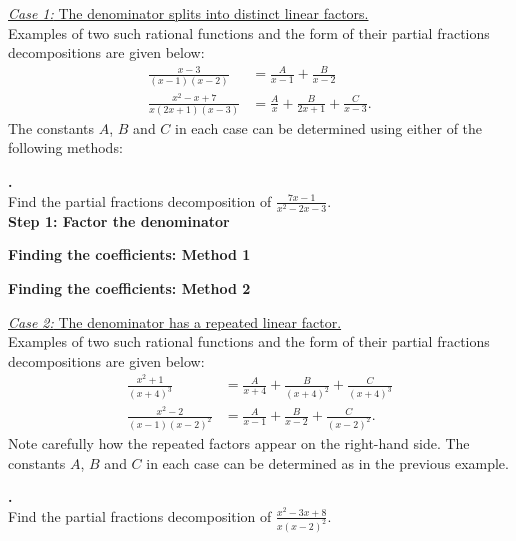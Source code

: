 \documentclass[t]{beamer}
\theoremstyle{plain}
\theoremstyle{definition}
\newcommand{\ds}{\displaystyle}
\newcounter{heading}
\newcommand{\newhead}[1]{\medskip\stepcounter{heading}\noindent\textbf{\hspace{0.2cm}{#1}.}}
\begin{document}
\begin{frame}
\noindent\underline{\textit{Case 1:} The denominator splits into distinct linear factors.}\pause\\
Examples of two such rational functions and the form of their partial fractions decompositions are given below:\pause
\begin{align*}
\frac{x-3}{(x-1)(x-2)}&= {\frac{A}{x-1}+\frac{B}{x-2}}\\
\frac{x^2-x+7}{x(2x+1)(x-3)}&= {\frac{A}{x}+\frac{B}{2x+1}+\frac{C}{x-3}}.
\end{align*}\pause
The constants $A$, $B$ and $C$ in each case can be determined using either of the following methods:\pause

\newhead{Example} \\Find the partial fractions decomposition of $\ds\frac{7x-1}{x^2-2x-3}$.\pause\\
\noindent \textbf{Step 1: Factor the denominator}

\medskip\pause

\noindent \textbf{Finding the coefficients: Method 1}

\medskip\pause

\noindent \textbf{Finding the coefficients: Method 2}
\end{frame}

\begin{frame}
\noindent\underline{\textit{Case 2:} The denominator has a repeated linear factor.}\pause\\
Examples of two such rational functions and the form of their partial fractions decompositions are given below:\pause
\begin{align*}
\frac{x^2+1}{(x+4)^3}&= {\frac{A}{x+4}+\frac{B}{(x+4)^2}+\frac{C}{(x+4)^3}}\\
\frac{x^2-2}{(x-1)(x-2)^2}&= {\frac{A}{x-1}+\frac{B}{x-2}+\frac{C}{(x-2)^2}}.
\end{align*}\pause
Note carefully how the repeated factors appear on the right-hand side. The constants $A$, $B$ and $C$ in each case can be determined as in the previous example.\pause

\newhead{Example} \\Find the partial fractions decomposition of $\ds\frac{x^2-3x+8}{x(x-2)^2}$.
\end{frame}
\end{document}
